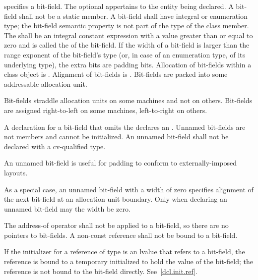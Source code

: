 %
%
specifies a bit-field.
The optional  appertains
to the entity being declared.
A bit-field shall not be a static member.
%
A bit-field shall have integral or enumeration type;
the bit-field semantic property is not part of the type of the class member.
The  shall be an integral constant expression
with a value greater than or equal to zero and
is called the  of the bit-field.
If the width of a bit-field is larger than
the range exponent of the bit-field's type
(or, in case of an enumeration type, of its underlying type),
the extra bits are padding bits.
%
Allocation of bit-fields within a class object is
.
%
Alignment of bit-fields is .
%
Bit-fields are packed into some addressable allocation unit.
\begin{note}
Bit-fields straddle allocation units on some machines and not on others.
Bit-fields are assigned right-to-left on some machines, left-to-right on
others.
\end{note}

\pnum
{}%
A declaration for a bit-field that omits the 
declares an . Unnamed bit-fields are not
members and cannot be initialized.
An unnamed bit-field shall not be declared with a cv-qualified type.
\begin{note}
An unnamed bit-field is useful for padding to conform to
externally-imposed layouts.
\end{note}
%
%
As a special case, an unnamed bit-field with a width of zero specifies
alignment of the next bit-field at an allocation unit boundary. Only
when declaring an unnamed bit-field may the width be zero.

\pnum
{}%
The address-of operator \tcode{\&} shall not be applied to a bit-field,
so there are no pointers to bit-fields.
%
%
%
A non-const reference shall not be bound to a
bit-field.
\begin{note}
If the initializer for a reference of type   is
an lvalue that refers to a bit-field, the reference is bound to a
temporary initialized to hold the value of the bit-field; the reference
is not bound to the bit-field directly. See~\ref{dcl.init.ref}.
\end{note}

